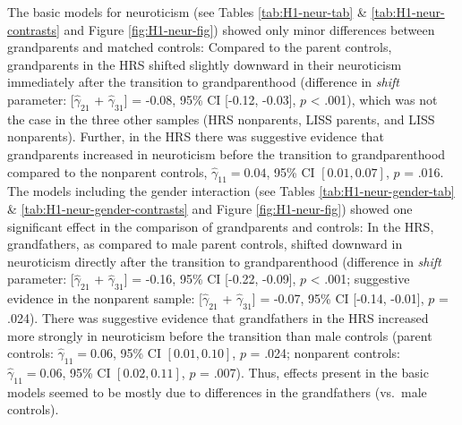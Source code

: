 \documentclass[
  english,
  man, noextraspace]{apa7}
\begin{document}
The basic models for neuroticism (see Tables \ref{tab:H1-neur-tab} \& \ref{tab:H1-neur-contrasts} and Figure \ref{fig:H1-neur-fig}) showed only minor differences between grandparents and matched controls: Compared to the parent controls, grandparents in the HRS shifted slightly downward in their neuroticism immediately after the transition to grandparenthood (difference in \emph{shift} parameter: {[}\(\hat{\gamma}_{21}\) + \(\hat{\gamma}_{31}\){]} = -0.08, 95\% CI {[}-0.12, -0.03{]}, \(p\) \textless{} .001), which was not the case in the three other samples (HRS nonparents, LISS parents, and LISS nonparents). Further, in the HRS there was suggestive evidence that grandparents increased in neuroticism before the transition to grandparenthood compared to the nonparent controls, \(\hat{\gamma}_{11} = 0.04\), 95\% CI \([0.01, 0.07]\), \(p\) = .016. The models including the gender interaction (see Tables \ref{tab:H1-neur-gender-tab} \& \ref{tab:H1-neur-gender-contrasts} and Figure \ref{fig:H1-neur-fig}) showed one significant effect in the comparison of grandparents and controls: In the HRS, grandfathers, as compared to male parent controls, shifted downward in neuroticism directly after the transition to grandparenthood (difference in \emph{shift} parameter: {[}\(\hat{\gamma}_{21}\) + \(\hat{\gamma}_{31}\){]} = -0.16, 95\% CI {[}-0.22, -0.09{]}, \(p\) \textless{} .001; suggestive evidence in the nonparent sample: {[}\(\hat{\gamma}_{21}\) + \(\hat{\gamma}_{31}\){]} = -0.07, 95\% CI {[}-0.14, -0.01{]}, \(p\) = .024). There was suggestive evidence that grandfathers in the HRS increased more strongly in neuroticism before the transition than male controls (parent controls: \(\hat{\gamma}_{11} = 0.06\), 95\% CI \([0.01, 0.10]\), \(p\) = .024; nonparent controls: \(\hat{\gamma}_{11} = 0.06\), 95\% CI \([0.02, 0.11]\), \(p\) = .007). Thus, effects present in the basic models seemed to be mostly due to differences in the grandfathers (vs.~male controls).\\
\end{document}
